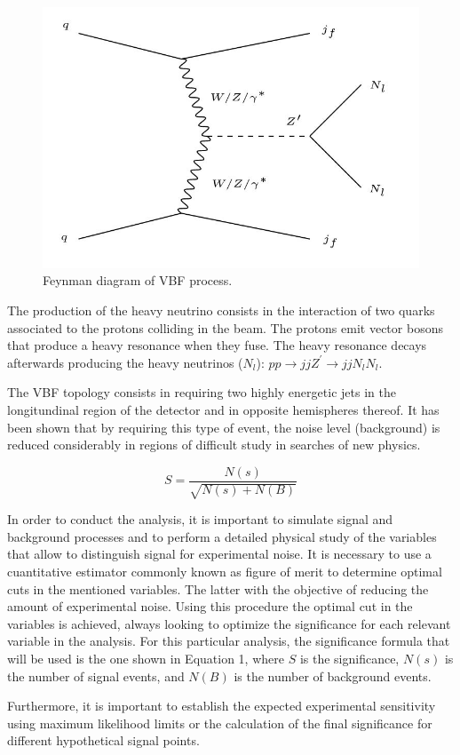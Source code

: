 \begin{figure}[H]
\centering
\includegraphics[scale = 0.65]{Figures/Feynman_VBF.JPG}
\caption{Feynman diagram of VBF process.}
\label{fig: VBF}
\end{figure}

The production of the heavy neutrino consists in the interaction of two quarks associated to the protons colliding in the beam. The protons emit vector bosons that produce a heavy resonance when they fuse. The heavy resonance decays afterwards producing the heavy neutrinos ($N_{l}$): $pp \rightarrow jj Z^{'} \rightarrow jj N_{l}N_{l}$.

The VBF topology consists in requiring two highly energetic jets in the longitundinal region of the detector and in opposite hemispheres thereof. It has been shown that by requiring this type of event, the noise level (background) is reduced considerably in regions of difficult study in searches of new physics.


\begin{equation}
    S = \frac{N(s)}{\sqrt{N(s) + N(B)}}
\end{equation}

In order to conduct the analysis, it is important to simulate signal and background processes and to perform a detailed physical study of the variables that allow to distinguish signal for experimental noise. It is necessary to use a cuantitative estimator commonly known as figure of merit to determine optimal cuts in the mentioned variables. The latter with the objective of reducing the amount of experimental noise. Using this procedure the optimal cut in the variables is achieved, always looking to optimize the significance for each relevant variable in the analysis. For this particular analysis, the significance formula that will be used is the one shown in Equation 1, where $S$ is the significance, $N(s)$ is the number of signal events, and $N(B)$ is the number of background events.

Furthermore, it is important to establish the expected experimental sensitivity using maximum likelihood limits or the calculation of the final significance for different hypothetical signal points.
